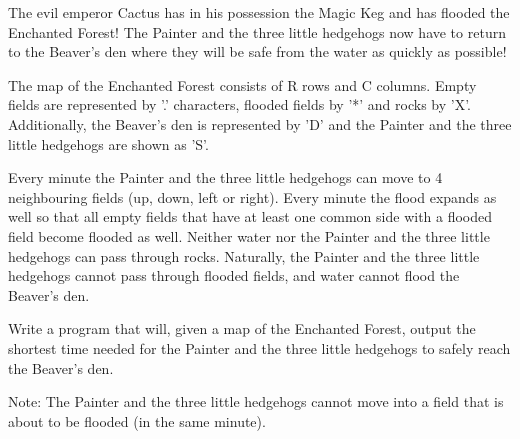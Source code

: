 The evil emperor Cactus has in his possession the Magic Keg and has flooded the Enchanted Forest! The Painter and the three little hedgehogs now have to return to the Beaver's den where they will be safe from the water as quickly as possible!

The map of the Enchanted Forest consists of R rows and C columns. Empty fields are represented by '.' characters, flooded fields by '*' and rocks by 'X'. Additionally, the Beaver's den is represented by 'D' and the Painter and the three little hedgehogs are shown as 'S'.

Every minute the Painter and the three little hedgehogs can move to 4 neighbouring fields (up, down, left or right). Every minute the flood expands as well so that all empty fields that have at least one common side with a flooded field become flooded as well. Neither water nor the Painter and the three little hedgehogs can pass through rocks. Naturally, the Painter and the three little hedgehogs cannot pass through flooded fields, and water cannot flood the Beaver's den.

Write a program that will, given a map of the Enchanted Forest, output the shortest time needed for the Painter and the three little hedgehogs to safely reach the Beaver's den.

Note: The Painter and the three little hedgehogs cannot move into a field that is about to be flooded (in the same minute).
